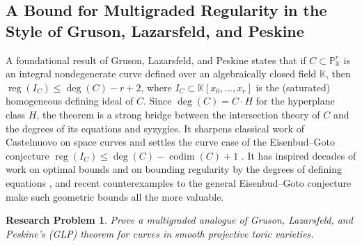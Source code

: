 \documentclass[11pt,reqno]{amsart}
\newtheorem{problem}[lemma]{Research Problem}
\theoremstyle{remark}
\newcommand{\reg}{\operatorname{reg}}
\newcommand{\codim}{\operatorname{codim}}
\newcommand{\KK}{\mathbb{K}}
\newcommand{\PP}{\mathbb{P}}
\begin{document}
 \subsection{A Bound for Multigraded Regularity in the Style of Gruson, Lazarsfeld, and Peskine}
 A foundational result of Gruson, Lazarsfeld, and Peskine \cite{GLP83} states that if $C \subset \PP^r_{\KK}$ is an integral nondegenerate curve defined over an algebraically closed field $\KK$, then $\reg\left(I_{C}\right) \leq \deg(C)-r+2$, where $I_{C} \subset \KK[x_0,\ldots,x_r]$ is the (saturated) homogeneous defining ideal of $C$. Since $\deg(C) = C \cdot H$ for the hyperplane class $H$, the theorem is a strong bridge between the intersection theory of $C$ and the degrees of its equations and syzygies. It sharpens classical work of Castelnuovo \cite{castelnuovo1893} on space curves and settles the curve case of the Eisenbud--Goto conjecture $\reg(I_C) \leq \deg(C) - \codim(C) + 1$ \cite{eisenbudGoto84}. It has inspired decades of work on optimal bounds \cite{pinkham86,lazarsfeld87,kwak98,kwak00,giaimo06} and on bounding regularity by the degrees of defining equations \cite{BEL91,einLazarsfeld93,CEL01,lozovanuSmith12}, and recent counterexamples to the general Eisenbud--Goto conjecture \cite{MP18,CCMPV19,McCulloughPeeva20} make such geometric bounds all the more valuable.

 \begin{problem}\label{prob:GLP}
 	Prove a multigraded analogue of Gruson, Lazarsfeld, and Peskine's (GLP) theorem for curves in smooth projective toric varieties.
\end{problem}
\end{document}
